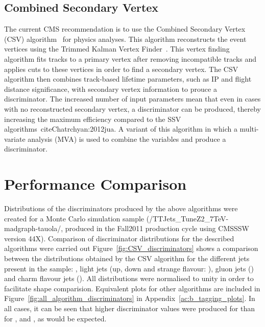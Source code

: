 \subsection*{Combined Secondary Vertex}
\label{ss:combined_secondary_vertex}
The current CMS recommendation is to use the Combined Secondary Vertex (CSV) algorithm~\cite{Weiser:2006md}
for physics analyses. This algorithm reconstructs the event vertices using the Trimmed Kalman Vertex
Finder~\cite{Speer:927395}. This vertex finding algorithm fits tracks to a primary vertex after removing
incompatible tracks and applies cuts to these vertices in order to find a secondary vertex. The CSV algorithm
then combines track-based lifetime parameters, such as IP and flight distance significance, with secondary
vertex information to prouce a discriminator. The increased number of input parameters mean that even in
cases with no reconstructed secondary vertex, a discriminator can be produced, thereby increasing the maximum
efficiency compared to the SSV algorithms~cite{Chatrchyan:2012jua}. A variant of this algorithm in which a
multi-variate analysis (MVA) is used to combine the variables and produce a discriminator.

\section{Performance Comparison}
\label{s:performance_comparison}

Distributions of the discriminators produced by the above algorithms were created for a \ttbar \MADGRAPH Monte
Carlo simulation sample (/TTJets\_TuneZ2\_7TeV-madgraph-tauola/, produced in the Fall2011 production cycle
using CMSSSW version 44X). Comparison of discriminator distributions for the described algorithms were carried
out Figure~\ref{fig:CSV_discriminators} shows a comparison between the distributions obtained by the CSV
algorithm for the different jets present in the sample: \bjets, light jets (up, down and strange flavour:
\udsjets), gluon jets (\gjets) and charm flavour jets (\cjets). All distributions were normalised to unity in
order to facilitate shape comparision. Equivalent plots for other algorithms are included in
Figure~\ref{fig:all_algorithm_discriminators} in Appendix~\ref{ac:b_tagging_plots}. In all cases, it can be
seen that higher discriminator values were produced for \bjets than for \udsjets, \gjets and \cjets, as would
be expected.

